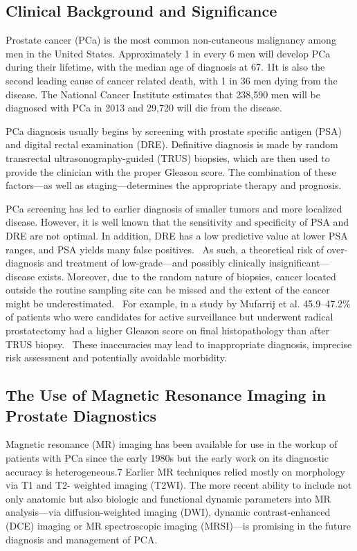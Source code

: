 ﻿\subsection{Clinical Background and Significance}
Prostate cancer (PCa) is the most common non-cutaneous malignancy among men in
the United States. Approximately 1 in every 6 men will develop PCa during their
lifetime, with the median age of diagnosis at 67. 1It is also the second
leading cause of cancer related death, with 1 in 36 men dying from the disease.
The National Cancer Institute estimates that 238,590 men will be diagnosed with
PCa in 2013 and 29,720 will die from the disease.~\cite{Howlader2011}

PCa diagnosis usually begins by screening with prostate specific antigen (PSA)
and digital rectal examination (DRE).  Definitive diagnosis is made by random
transrectal ultrasonography-guided (TRUS) biopsies, which are then used to
provide the clinician with the proper Gleason score. The combination of these
factors—as well as staging—determines the appropriate therapy and prognosis. 

PCa screening has led to earlier diagnosis of smaller tumors and more localized
disease.  However, it is well known that the sensitivity and specificity of PSA
and DRE are not optimal. In addition, DRE has a low predictive value at lower
PSA ranges, and PSA yields many false
positives.~\cite{Gosselaar2007,Gupta2013,Hricak2007} As such, a theoretical
risk of over-diagnosis and treatment of low-grade—and possibly clinically
insignificant—disease exists. Moreover, due to the random nature of biopsies,
cancer located outside the routine sampling site can be missed and the extent
of the cancer might be underestimated.~\cite{Gupta2013,Cornud1012} For example,
in a study by Mufarrij et al. 45.9--47.2\% of patients who were candidates for
active surveillance but underwent radical prostatectomy had a higher Gleason
score on final histopathology than after TRUS biopsy.~\cite{Mufarrij2010} These
inaccuracies may lead to inappropriate diagnosis, imprecise risk assessment and
potentially avoidable morbidity.

\subsection*{The Use of Magnetic Resonance Imaging in Prostate Diagnostics}
Magnetic resonance (MR) imaging has been available for use in the workup of
patients with PCa since the early 1980s but the early work on its diagnostic
accuracy is heterogeneous.7 Earlier MR techniques relied mostly on morphology
via T1 and T2- weighted imaging (T2WI). The more recent ability to include not
only anatomic but also biologic and functional dynamic parameters into MR
analysis—via diffusion-weighted imaging (DWI), dynamic contrast-enhanced (DCE)
imaging or MR spectroscopic imaging (MRSI)—is promising in the future diagnosis
and management of PCA.

